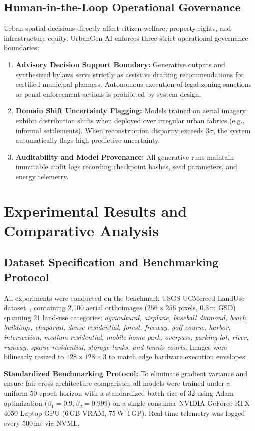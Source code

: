 \documentclass[journal]{IEEEtran}
\begin{document}
\subsection{Human-in-the-Loop Operational Governance}
Urban spatial decisions directly affect citizen welfare, property rights, and infrastructure equity. UrbanGen AI enforces three strict operational governance boundaries:
\begin{enumerate}
    \item \textbf{Advisory Decision Support Boundary:} Generative outputs and synthesized bylaws serve strictly as assistive drafting recommendations for certified municipal planners. Autonomous execution of legal zoning sanctions or penal enforcement actions is prohibited by system design.
    \item \textbf{Domain Shift Uncertainty Flagging:} Models trained on aerial imagery exhibit distribution shifts when deployed over irregular urban fabrics (e.g., informal settlements). When reconstruction disparity exceeds $3\sigma$, the system automatically flags high predictive uncertainty.
    \item \textbf{Auditability and Model Provenance:} All generative runs maintain immutable audit logs recording checkpoint hashes, seed parameters, and energy telemetry.
\end{enumerate}

\section{Experimental Results and Comparative Analysis}

\subsection{Dataset Specification and Benchmarking Protocol}
All experiments were conducted on the benchmark USGS UCMerced LandUse dataset~\cite{yang2010bag}, containing 2,100 aerial orthoimages ($256 \times 256$ pixels, 0.3\,m GSD) spanning 21 land-use categories: \textit{agricultural, airplane, baseball diamond, beach, buildings, chaparral, dense residential, forest, freeway, golf course, harbor, intersection, medium residential, mobile home park, overpass, parking lot, river, runway, sparse residential, storage tanks, and tennis courts}. Images were bilinearly resized to $128 \times 128 \times 3$ to match edge hardware execution envelopes.

\noindent\textbf{Standardized Benchmarking Protocol:} To eliminate gradient variance and ensure fair cross-architecture comparison, all models were trained under a uniform 50-epoch horizon with a standardized batch size of 32 using Adam optimization ($\beta_1=0.9, \beta_2=0.999$) on a single consumer NVIDIA GeForce RTX 4050 Laptop GPU (6\,GB VRAM, 75\,W TGP). Real-time telemetry was logged every 500\,ms via NVML.
\end{document}
